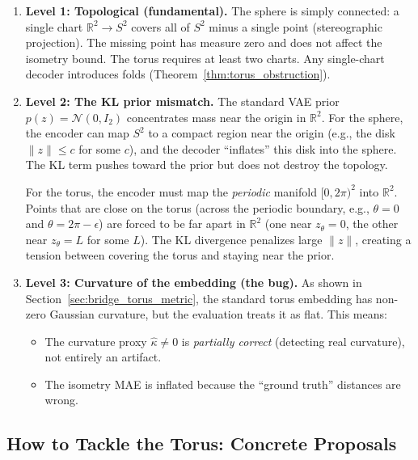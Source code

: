 \documentclass{article}
\begin{document}
\begin{enumerate}
\item \textbf{Level 1: Topological (fundamental).}
  The sphere is simply connected: a single chart $\mathbb{R}^2 \to S^2$ covers
  all of $S^2$ minus a single point (stereographic projection). The missing
  point has measure zero and does not affect the isometry bound.
  The torus requires at least two charts. Any single-chart decoder introduces
  folds (Theorem~\ref{thm:torus_obstruction}).

\item \textbf{Level 2: The KL prior mismatch.}
  The standard VAE prior $p(z) = \mathcal{N}(0, I_2)$ concentrates mass near the
  origin in $\mathbb{R}^2$. For the sphere, the encoder can map $S^2$ to a compact
  region near the origin (e.g., the disk $\|z\| \leq c$ for some $c$), and the
  decoder ``inflates'' this disk into the sphere. The KL term pushes toward the
  prior but does not destroy the topology.

  For the torus, the encoder must map the \textit{periodic} manifold
  $[0, 2\pi)^2$ into $\mathbb{R}^2$. Points that are close on the torus
  (across the periodic boundary, e.g., $\theta = 0$ and $\theta = 2\pi - \epsilon$)
  are forced to be far apart in $\mathbb{R}^2$ (one near $z_\theta = 0$, the
  other near $z_\theta = L$ for some $L$). The KL divergence penalizes large
  $\|z\|$, creating a tension between covering the torus and staying near
  the prior.

\item \textbf{Level 3: Curvature of the embedding (the bug).}
  As shown in Section~\ref{sec:bridge_torus_metric}, the standard torus
  embedding has non-zero Gaussian curvature, but the evaluation treats it
  as flat. This means:
  \begin{itemize}
    \item The curvature proxy $\hat{\kappa} \neq 0$ is \textit{partially correct}
      (detecting real curvature), not entirely an artifact.
    \item The isometry MAE is inflated because the ``ground truth'' distances
      are wrong.
  \end{itemize}
\end{enumerate}

\subsection{How to Tackle the Torus: Concrete Proposals}
\end{document}
